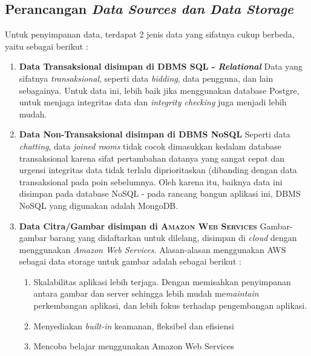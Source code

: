 
\subsection{Perancangan \textit{Data Sources dan Data Storage}}

	Untuk penyimpanan data, terdapat 2 jenis data yang sifatnya cukup berbeda, yaitu sebagai berikut :
    \\
    
    \begin{enumerate}
    \item \textbf{Data Transaksional disimpan di DBMS SQL - \textit{Relational}}
    \newline
    Data yang sifatnya \textit{transaksional}, seperti data \textit{bidding}, data pengguna, dan lain sebagainya.
    Untuk data ini, lebih baik jika menggunakan database Postgre, untuk menjaga integritas data dan \textit{integrity checking} juga  menjadi lebih mudah.
    \newline
    
    \item 
    \textbf{Data Non-Transaksional disimpan di DBMS NoSQL}
    \newline
    Seperti data \textit{chatting}, data \textit{joined rooms} tidak cocok dimasukkan kedalam database transaksional karena sifat pertambahan datanya yang sangat cepat dan urgensi integritas data tidak terlalu diprioritaskan (dibanding dengan data transaksional pada poin sebelumnya.
    \newline
    Oleh karena itu, baiknya data ini disimpan pada database NoSQL - pada rancang bangun aplikasi ini, DBMS NoSQL yang digunakan adalah MongoDB.
    \newline
    
    
    \item \textbf{Data Citra/Gambar disimpan di \textsc{Amazon Web Services}} \newline
    Gambar-gambar barang yang didaftarkan untuk dilelang, disimpan di \textit{cloud} dengan menggunakan \textit{Amazon Web Services}. Alasan-alasan menggunakan AWS sebagai data storage untuk gambar adalah sebagai berikut :
        \begin{enumerate}[noitemsep,topsep=0pt]
        \item Skalabilitas aplikasi lebih terjaga. 
        \newline Dengan memisahkan penyimpanan antara gambar dan server sehingga lebih mudah me\textit{maintain} perkembangan aplikasi, dan lebih fokus terhadap pengembangan aplikasi.
        \item Menyediakan \textit{built-in} keamanan, fleksibel dan efisiensi \cite{wikipedia_amazon_2016}
        \item Mencoba belajar menggunakan Amazon Web Services
        \end{enumerate}
        

\end{enumerate}
